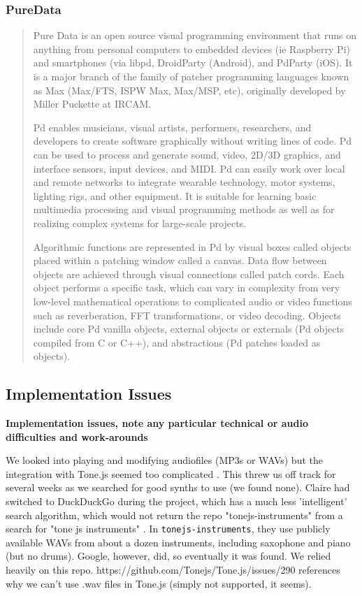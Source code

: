 \documentclass[12pt,a4paper]{article}
\newcommand{\lightcode}[1]{\colorbox{light-gray}{\texttt{#1}}}
\begin{document}
\subsubsection{PureData}

\begin{quote}
Pure Data is an open source visual programming environment that runs on anything from personal computers to embedded devices (ie Raspberry Pi) and smartphones (via libpd, DroidParty (Android), and PdParty (iOS). It is a major branch of the family of patcher programming languages known as Max (Max/FTS, ISPW Max, Max/MSP, etc), originally developed by Miller Puckette at IRCAM.

Pd enables musicians, visual artists, performers, researchers, and developers to create software graphically without writing lines of code. Pd can be used to process and generate sound, video, 2D/3D graphics, and interface sensors, input devices, and MIDI. Pd can easily work over local and remote networks to integrate wearable technology, motor systems, lighting rigs, and other equipment. It is suitable for learning basic multimedia processing and visual programming methods as well as for realizing complex systems for large-scale projects.

Algorithmic functions are represented in Pd by visual boxes called objects placed within a patching window called a canvas. Data flow between objects are achieved through visual connections called patch cords. Each object performs a specific task, which can vary in complexity from very low-level mathematical operations to complicated audio or video functions such as reverberation, FFT transformations, or video decoding. Objects include core Pd vanilla objects, external objects or externals (Pd objects compiled from C or C++), and abstractions (Pd patches loaded as objects). \cite{puredata}
\end{quote}

\subsection{Implementation Issues}
\textbf{Implementation issues, note any particular technical or audio difficulties and work-arounds}

We looked into playing and modifying audiofiles (MP3s or WAVs) but the integration with Tone.js seemed too complicated \cite{tonejs-issue}. This threw us off track for several weeks as we searched for good synths to use (we found none). Claire had switched to DuckDuckGo during the project, which has a much less 'intelligent' search algorithm, which would not return the repo "tonejs-instruments" from a search for "tone js instruments" \cite{tonejs-instruments}. In \lightcode{tonejs-instruments}, they use publicly available WAVs from about a dozen instruments, including saxophone and piano (but no drums). Google, however, did, so eventually it was found. We relied heavily on this repo. https://github.com/Tonejs/Tone.js/issues/290 references why we can't use .wav files in Tone.js (simply not supported, it seems). 
\end{document}
